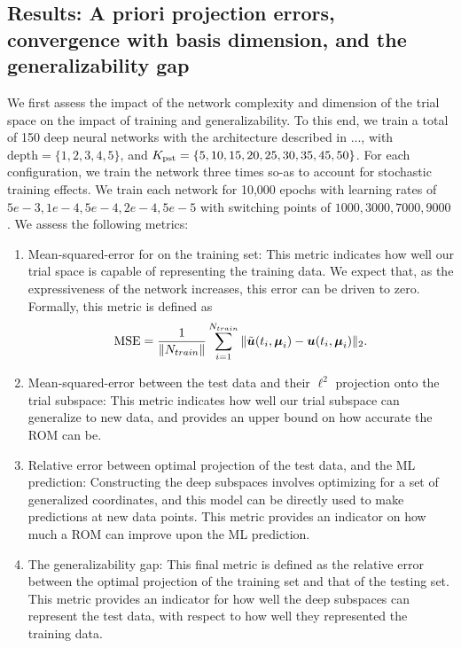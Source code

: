 \documentclass[3p,computermodern,10pt]{elsarticle}
\begin{document}
\subsection{Results: A priori projection errors, convergence with basis dimension, and the generalizability gap}
We first assess the impact of the network complexity and dimension of the trial space on the impact of training and generalizability. To this end, we train a total of 150 deep neural networks with the architecture described in ..., with $\text{depth} = \{1,2,3,4,5\}$, and $K_{\text{pst}} = \{5,10,15,20,25,30,35,45,50\}$. For each configuration, we train the network three times so-as to account for stochastic training effects. We train each network for 10,000 epochs with learning rates of $5e-3,1e-4,5e-4,2e-4,5e-5$ with switching points of $1000,3000,7000,9000$. We assess the following metrics:
\begin{enumerate}
\item Mean-squared-error for on the training set: This metric indicates how well our trial space is capable of representing the training data. We expect that, as the expressiveness of the network increases, this error can be driven to zero. Formally, this metric is defined as
$$\text{MSE} = \frac{1}{ \| N_{train} \| } \sum_{i=1}^{N_{train}} \| \tilde{\boldsymbol u}(t_i,\boldsymbol \mu_i) - \boldsymbol u(t_i,\boldsymbol \mu_i) \|_2.$$

\item Mean-squared-error between the test data and their $\ell^2$ projection onto the trial subspace: This metric indicates how well our trial subspace can generalize to new data, and provides an upper bound on how accurate the ROM can be.

\item Relative error between optimal projection of the test data, and the ML prediction: Constructing the deep subspaces involves optimizing for a set of generalized coordinates, and this model can be directly used to make predictions at new data points. This metric provides an indicator on how much a ROM can improve upon the ML prediction.

\item The generalizability gap: This final metric is defined as the relative error between the optimal projection of the training set and that of the testing set. This metric provides an indicator for how well the deep subspaces can represent the test data, with respect to how well they represented the training data.  
\end{enumerate}
\end{document}

